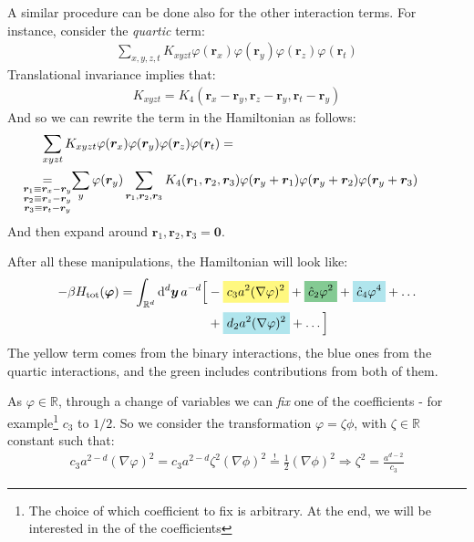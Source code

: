 \documentclass[../../main.tex]{subfiles}
\begin{document}
A similar procedure can be done also for the other interaction terms. For instance, consider the \textit{quartic} term:
\begin{align*}
    \sum_{x,y,z,t} K_{xyzt} \varphi(\bm{r}_x) \varphi(\bm{r}_y) \varphi(\bm{r}_z) \varphi(\bm{r}_t)
\end{align*} 
Translational invariance implies that:
\begin{align*}
    K_{xyzt} = K_4(\bm{r}_x-\bm{r}_y, \bm{r}_z-\bm{r}_y, \bm{r}_t-\bm{r}_y)
\end{align*}
And so we can rewrite the term in the Hamiltonian as follows:
\begin{align*}
    \sum_{xyzt} K_{xyzt} \varphi(\bm{r}_x) \varphi(\bm{r}_y) \varphi(\bm{r}_z) \varphi(\bm{r}_t) =\\
    \underset{\mathclap{\substack{
        \bm{r}_1 \equiv \bm{r}_x - \bm{r}_y\\
        \bm{r}_2 \equiv \bm{r}_z - \bm{r}_y\\
        \bm{r}_3 \equiv \bm{r}_t - \bm{r}_y
    }}}{=}\quad\>  \sum_y \varphi(\bm{r}_y) \sum_{\bm{r}_1, \bm{r}_2, \bm{r}_3} K_4(\bm{r}_1, \bm{r}_2, \bm{r}_3) \varphi(\bm{r}_y + \bm{r}_1) \varphi(\bm{r}_y + \bm{r}_2) \varphi(\bm{r}_y + \bm{r}_3)\span
\end{align*}
And then expand around $\bm{r}_1, \bm{r}_2, \bm{r}_3 = \bm{0}$.

\medskip

After all these manipulations, the Hamiltonian will look like:
\begin{align*}
    - \beta H_{\mathrm{tot}}(\bm{\varphi}) = \int_{\mathbb{R}^d} \dd[d]{\bm{y}} a^{-d} \Big[&-\hlc{Yellow}{c_3 a^2 (\nabla \varphi)^2 }+ \hlc{ForestGreen}{\hat{c}_2 \varphi^2 }+ \hlc{SkyBlue}{\hat{c}_4 \varphi^4 }+ \dots \\
    &+\hlc{SkyBlue}{d_2 a^2 (\nabla \varphi)^2 }+ \dots \Big]
\end{align*}
The yellow term comes from the binary interactions, the blue ones from the quartic interactions, and the green includes contributions from both of them.

\medskip

As $\varphi \in \mathbb{R}$, through a change of variables we can \textit{fix} one of the coefficients - for example\footnote{The choice of which coefficient to fix is arbitrary. At the end, we will be interested in the  of the coefficients} $c_3$ to $1/2$. So we consider the transformation $\varphi = \zeta \phi$, with $\zeta \in \mathbb{R}$ constant such that:
\begin{align*}
    c_3 a^{2-d} (\nabla \varphi)^2 = c_3 a^{2-d}\zeta^2(\nabla \phi)^2 \overset{!}{=}  \frac{1}{2} (\nabla \phi)^2 \Rightarrow \zeta^2 = \frac{a^{d-2}}{c_3} 
\end{align*}  
\end{document}

